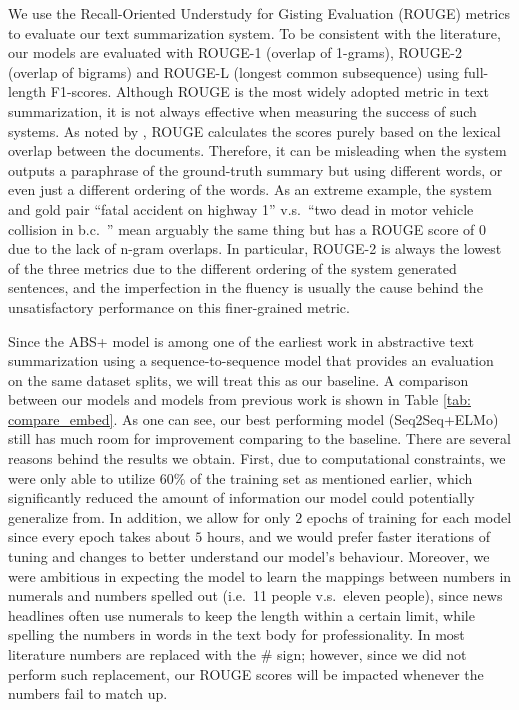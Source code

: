 We use the Recall-Oriented Understudy for Gisting Evaluation (ROUGE) metrics \cite{lin2004rouge} to evaluate our text summarization system. To be consistent with the literature, our models are evaluated with ROUGE-1 (overlap of 1-grams), ROUGE-2 (overlap of bigrams) and ROUGE-L (longest common subsequence) using full-length F1-scores. Although ROUGE is the most widely adopted metric in text summarization, it is not always effective when measuring the success of such systems. As noted by \cite{cohan2016revisiting}, ROUGE calculates the scores purely based on the lexical overlap between the documents. Therefore, it can be misleading when the system outputs a paraphrase of the ground-truth summary but using different words, or even just a different ordering of the words. As an extreme example, the system and gold pair ``fatal accident on highway 1'' v.s.\ ``two dead in motor vehicle collision in b.c.\ '' mean arguably the same thing but has a ROUGE score of $0$ due to the lack of n-gram overlaps. In particular, ROUGE-2 is always the lowest of the three metrics due to the different ordering of the system generated sentences, and the imperfection in the fluency is usually the cause behind the unsatisfactory performance on this finer-grained metric.

Since the ABS+ model \cite{rush2015neural} is among one of the earliest work in abstractive text summarization using a sequence-to-sequence model that provides an evaluation on the same dataset splits, we will treat this as our baseline. A comparison between our models and models from previous work is shown in Table \ref{tab: compare_embed}. As one can see, our best performing model (Seq2Seq+ELMo) still has much room for improvement comparing to the baseline. There are several reasons behind the results we obtain. First, due to computational constraints, we were only able to utilize $60\%$ of the training set as mentioned earlier, which significantly reduced the amount of information our model could potentially generalize from. In addition, we allow for only $2$ epochs of training for each model since every epoch takes about $5$ hours, and we would prefer faster iterations of tuning and changes to better understand our model's behaviour. Moreover, we were ambitious in expecting the model to learn the mappings between numbers in numerals and numbers spelled out (i.e.\ 11 people v.s.\ eleven people), since news headlines often use numerals to keep the length within a certain limit, while spelling the numbers in words in the text body for professionality. In most literature numbers are replaced with the $\#$ sign; however, since we did not perform such replacement, our ROUGE scores will be impacted whenever the numbers fail to match up. 

